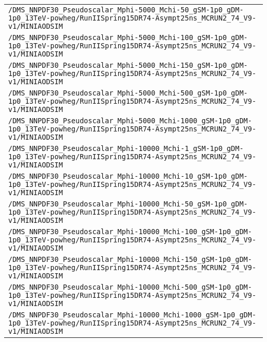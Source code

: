 \begin{center}
\begin{tabular}{l}
\verb!/DMS_NNPDF30_Pseudoscalar_Mphi-5000_Mchi-50_gSM-1p0_gDM-1p0_13TeV-powheg/RunIISpring15DR74-Asympt25ns_MCRUN2_74_V9-v1/MINIAODSIM! \tabularnewline
\verb!/DMS_NNPDF30_Pseudoscalar_Mphi-5000_Mchi-100_gSM-1p0_gDM-1p0_13TeV-powheg/RunIISpring15DR74-Asympt25ns_MCRUN2_74_V9-v1/MINIAODSIM! \tabularnewline
\verb!/DMS_NNPDF30_Pseudoscalar_Mphi-5000_Mchi-150_gSM-1p0_gDM-1p0_13TeV-powheg/RunIISpring15DR74-Asympt25ns_MCRUN2_74_V9-v1/MINIAODSIM! \tabularnewline
\verb!/DMS_NNPDF30_Pseudoscalar_Mphi-5000_Mchi-500_gSM-1p0_gDM-1p0_13TeV-powheg/RunIISpring15DR74-Asympt25ns_MCRUN2_74_V9-v1/MINIAODSIM! \tabularnewline
\verb!/DMS_NNPDF30_Pseudoscalar_Mphi-5000_Mchi-1000_gSM-1p0_gDM-1p0_13TeV-powheg/RunIISpring15DR74-Asympt25ns_MCRUN2_74_V9-v1/MINIAODSIM! \tabularnewline
\verb!/DMS_NNPDF30_Pseudoscalar_Mphi-10000_Mchi-1_gSM-1p0_gDM-1p0_13TeV-powheg/RunIISpring15DR74-Asympt25ns_MCRUN2_74_V9-v1/MINIAODSIM! \tabularnewline
\verb!/DMS_NNPDF30_Pseudoscalar_Mphi-10000_Mchi-10_gSM-1p0_gDM-1p0_13TeV-powheg/RunIISpring15DR74-Asympt25ns_MCRUN2_74_V9-v1/MINIAODSIM! \tabularnewline
\verb!/DMS_NNPDF30_Pseudoscalar_Mphi-10000_Mchi-50_gSM-1p0_gDM-1p0_13TeV-powheg/RunIISpring15DR74-Asympt25ns_MCRUN2_74_V9-v1/MINIAODSIM! \tabularnewline
\verb!/DMS_NNPDF30_Pseudoscalar_Mphi-10000_Mchi-100_gSM-1p0_gDM-1p0_13TeV-powheg/RunIISpring15DR74-Asympt25ns_MCRUN2_74_V9-v1/MINIAODSIM! \tabularnewline
\verb!/DMS_NNPDF30_Pseudoscalar_Mphi-10000_Mchi-150_gSM-1p0_gDM-1p0_13TeV-powheg/RunIISpring15DR74-Asympt25ns_MCRUN2_74_V9-v1/MINIAODSIM! \tabularnewline
\verb!/DMS_NNPDF30_Pseudoscalar_Mphi-10000_Mchi-500_gSM-1p0_gDM-1p0_13TeV-powheg/RunIISpring15DR74-Asympt25ns_MCRUN2_74_V9-v1/MINIAODSIM! \tabularnewline
\verb!/DMS_NNPDF30_Pseudoscalar_Mphi-10000_Mchi-1000_gSM-1p0_gDM-1p0_13TeV-powheg/RunIISpring15DR74-Asympt25ns_MCRUN2_74_V9-v1/MINIAODSIM! \tabularnewline
\hline
\end{tabular}\end{center}
